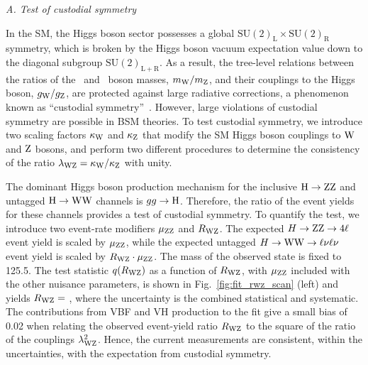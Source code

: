 \documentclass[12pt,twoside,a4paper,cmspaper,final,collab]{cms-tdr}
\begin{document}
\textit{A. Test of custodial symmetry}

In the SM, the Higgs boson sector possesses a global $\mathrm{SU(2)_L \times SU(2)_R}$
symmetry, which is broken by the Higgs boson vacuum expectation value down to
the diagonal subgroup $\mathrm{SU(2)_{L+R}}$. As a result, the tree-level relations
between the ratios of the \PW\ and \cPZ\ boson  masses, $m_{\mathrm{W}} / m_{\mathrm{Z}}$,
and their couplings to the Higgs boson, $g_{\mathrm{W}} / g_{\mathrm{Z}}$,
are protected against large radiative corrections,
a phenomenon known as ``custodial symmetry''~\cite{Veltman:1977kh,Sikivie:1980hm}.
However, large violations of custodial symmetry are possible in BSM theories.
To test custodial symmetry, we introduce two scaling factors
$\kappa_{\mathrm{W}}$ and $\kappa_{\mathrm{Z}}$ that modify
the SM Higgs boson couplings to $\mathrm{W}$ and $\mathrm{Z}$ bosons,
and perform two different procedures to determine the consistency of
the ratio $\lambda_{\mathrm{W}\mathrm{Z}} = \kappa_{\mathrm{W}} / \kappa_{\mathrm{Z}}$ with unity.

The dominant Higgs boson production mechanism for the inclusive $\mathrm{H} \to \mathrm{Z}\mathrm{Z}$
and untagged $\mathrm{H} \to \mathrm{W}\mathrm{W}$ channels is $gg \to \mathrm{H}$. Therefore,
the ratio of the event yields for these channels provides a test of custodial symmetry.
To quantify the test, we introduce two event-rate modifiers $\mu_{\mathrm{Z}\mathrm{Z}}$ and $R_{\mathrm{W}\mathrm{Z}}$.
The expected $H \to \mathrm{Z}\mathrm{Z} \to 4\ell$ event yield is scaled by $\mu_{\mathrm{Z}\mathrm{Z}}$,
while the expected untagged $H \to \mathrm{W}\mathrm{W} \to \ell\nu\ell\nu$ event yield is
scaled by $R_{\mathrm{W}\mathrm{Z}} \cdot \mu_{\mathrm{Z}\mathrm{Z}}$.
The mass of the observed state is fixed to {\color{black} 125.5}\GeV.
The test statistic $q(R_{\mathrm{W}\mathrm{Z}})$ as a function of $R_{\mathrm{W}\mathrm{Z}}$, with $\mu_{\mathrm{Z}\mathrm{Z}}$ included
with the other nuisance parameters,
is shown in Fig.~\ref{fig:fit_rwz_scan} (left) and yields
$R_{\mathrm{W}\mathrm{Z}} =$ \Rwz, where the uncertainty is the combined
statistical and systematic.
The contributions from VBF and VH production to the fit
give a small bias of 0.02  when relating the observed event-yield ratio
$R_{\mathrm{W}\mathrm{Z}}$ to the square of the ratio of the couplings $\lambda^2_{\mathrm{W}\mathrm{Z}}$.
Hence, the current measurements
are consistent, within the uncertainties, with the expectation from custodial symmetry.
\end{document}
